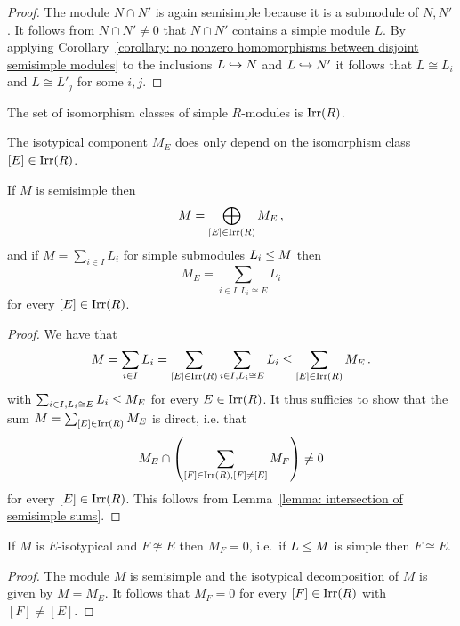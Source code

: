 \begin{proof}
  The module $N \cap N'$ is again semisimple because it is a submodule of $N, N'$.
  It follows from $N \cap N' \neq 0$ that $N \cap N'$ contains a simple module $L$.
  By applying Corollary~\ref{corollary: no nonzero homomorphisms between disjoint semisimple modules} to the inclusions $L \hookrightarrow N$ and $L \hookrightarrow N'$ it follows that $L \cong L_i$ and $L \cong L'_j$ for some $i, j$.
\end{proof}


\begin{definition}
  The set of isomorphism classes of simple $R$-modules is $\operatorname{Irr}(R)$.
\end{definition}


\begin{remark}
  The isotypical component $M_E$ does only depend on the isomorphism class $[E] \in \operatorname{Irr}(R)$.
\end{remark}


\begin{theorem}
  \label{theorem: isotypical decomposition}
  If $M$ is semisimple then
  \[
      M
    = \bigoplus_{[E] \in \operatorname{Irr}(R)} M_E \,,
  \]
  and if $M = \sum_{i \in I} L_i$ for simple submodules $L_i \leq M$ then
  \[
      M_E
    = \sum_{i \in I, L_i \cong E} L_i
  \]
  for every $[E] \in \operatorname{Irr}(R)$.
\end{theorem}


\begin{proof}
  We have that
  \[
              M
    =         \sum_{i \in I} L_i
    =         \sum_{[E] \in \operatorname{Irr}(R)} \sum_{i \in I, L_i \cong E} L_i
    \leq \sum_{[E] \in \operatorname{Irr}(R)} M_E \,.
  \]
  with $\sum_{i \in I, L_i \cong E} L_i \leq M_E$ for every $E \in \operatorname{Irr}(R)$.
  It thus sufficies to show that the sum $M  = \sum_{[E] \in \operatorname{Irr}(R)} M_E$ is direct, i.e. that
  \[
          M_E \cap \left( \sum_{[F] \in \operatorname{Irr}(R), [F] \neq [E]} M_F \right)
    \neq  0
  \]
  for every $[E] \in \operatorname{Irr}(R)$.
  This follows from Lemma~\ref{lemma: intersection of semisimple sums}.
\end{proof}


\begin{corollary}
  \label{corollary: isotypical components of isotypicial modules}
  If $M$ is $E$-isotypical and $F \ncong E$ then $M_F = 0$, i.e.\ if $L \leq M$ is simple then $F \cong E$.
\end{corollary}


\begin{proof}
  The module $M$ is semisimple and the isotypical decomposition of $M$ is given by $M = M_E$.
  It follows that $M_F = 0$ for every $[F] \in \operatorname{Irr}(R)$ with $[F] \neq [E]$.
\end{proof}


